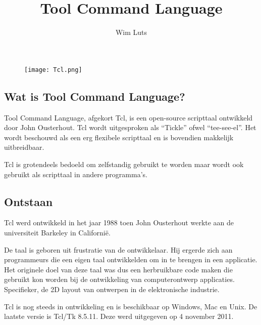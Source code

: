 \documentclass{article}
\begin{document}
\begin{titlepage}
\title{Tool Command Language}
\author{Wim Luts}
\date{}
\maketitle
\begin{center}
\begin{figure}[htp]
\centering
\texttt{[image: Tcl.png]}
\label{Logo}
\end{figure}
\end{center}
\end{titlepage}
\newpage
\begin{center}
\tableofcontents
\listoffigures
\listoftables
\end{center}
\newpage
\begin{flushleft}
\section{Wat is Tool Command Language?}
Tool Command Language, afgekort Tcl, is een open-source scripttaal ontwikkeld door John Ousterhout. Tcl wordt uitgesproken als “Tickle” ofwel “tee-see-el”. Het wordt beschouwd als een erg flexibele scripttaal en is bovendien makkelijk uitbreidbaar.\medskip

Tcl is grotendeels bedoeld om zelfstandig gebruikt te worden maar wordt ook gebruikt als scripttaal in andere programma’s.
\subsection{Ontstaan}
Tcl werd ontwikkeld in het jaar 1988 toen John Ousterhout werkte aan de universiteit Barkeley in Californië.\medskip

De taal is geboren uit frustratie van de ontwikkelaar. Hij ergerde zich aan programmeurs die een eigen taal ontwikkelden om in te brengen in een applicatie. Het originele doel van deze taal was dus een herbruikbare code maken die gebruikt kon worden bij de ontwikkeling van computerontwerp applicaties. Specifieker, de 2D layout van ontwerpen in de elektronische industrie.\medskip

Tcl is nog steeds in ontwikkeling en is beschikbaar op Windows, Mac en Unix. De laatste versie is Tcl/Tk 8.5.11. Deze werd uitgegeven op 4 november 2011.

\end{flushleft}
\end{document}
